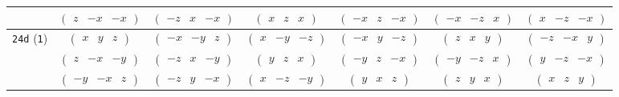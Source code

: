 \documentclass[fleqn,9pt,landscape]{jsarticle}
\begin{document}
\begin{center}
\begin{longtable}{ccccccc}
& $ \begin{pmatrix} z & - x & - x \end{pmatrix} $ & $ \begin{pmatrix} - z & x & - x \end{pmatrix} $ & $ \begin{pmatrix} x & z & x \end{pmatrix} $ & $ \begin{pmatrix} - x & z & - x \end{pmatrix} $ & $ \begin{pmatrix} - x & - z & x \end{pmatrix} $ & $ \begin{pmatrix} x & - z & - x \end{pmatrix} $ \\ \hline
{\tt 24d} ({\tt 1}) & $ \begin{pmatrix} x & y & z \end{pmatrix} $ & $ \begin{pmatrix} - x & - y & z \end{pmatrix} $ & $ \begin{pmatrix} x & - y & - z \end{pmatrix} $ & $ \begin{pmatrix} - x & y & - z \end{pmatrix} $ & $ \begin{pmatrix} z & x & y \end{pmatrix} $ & $ \begin{pmatrix} - z & - x & y \end{pmatrix} $ \\
& $ \begin{pmatrix} z & - x & - y \end{pmatrix} $ & $ \begin{pmatrix} - z & x & - y \end{pmatrix} $ & $ \begin{pmatrix} y & z & x \end{pmatrix} $ & $ \begin{pmatrix} - y & z & - x \end{pmatrix} $ & $ \begin{pmatrix} - y & - z & x \end{pmatrix} $ & $ \begin{pmatrix} y & - z & - x \end{pmatrix} $ \\
& $ \begin{pmatrix} - y & - x & z \end{pmatrix} $ & $ \begin{pmatrix} - z & y & - x \end{pmatrix} $ & $ \begin{pmatrix} x & - z & - y \end{pmatrix} $ & $ \begin{pmatrix} y & x & z \end{pmatrix} $ & $ \begin{pmatrix} z & y & x \end{pmatrix} $ & $ \begin{pmatrix} x & z & y \end{pmatrix} $ \\

\end{longtable}
\end{center}
\end{document}
